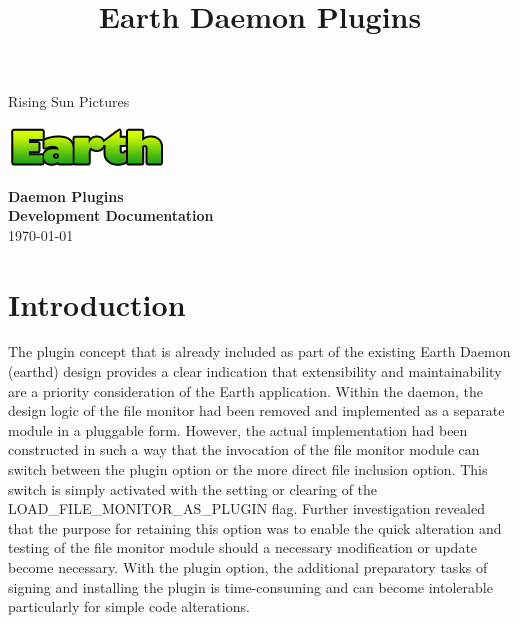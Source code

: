 \documentclass{article}
\title{Earth Daemon Plugins}
\begin{document}
\begin{titlepage}
    \begin{center}
        Rising Sun Pictures \\
        \vspace{1cm}
        \begin{center}                
        \includegraphics{earth.png} \\
        \end{center}
        \vspace{5cm}
        {\LARGE\bf Daemon Plugins} \\
        \vspace{5cm}
        {\LARGE\bf Development Documentation} \\
        \vspace{6cm}
        \today
    \end{center}
\end{titlepage}

\tableofcontents
\listoffigures

\newpage

\section{Introduction} %
\label{sec:introduction}

\noindent
The plugin concept that is already included as part of the existing Earth Daemon (earthd) design provides a clear indication that extensibility and maintainability are a priority consideration of the Earth application. Within the daemon, the design logic of the file monitor had been removed and implemented as a separate module in a pluggable form. However, the actual implementation had been constructed in such a way that the invocation of the file monitor module can switch between the plugin option or the more direct file inclusion option. This switch is simply activated with the setting or clearing of the LOAD\_FILE\_MONITOR\_AS\_PLUGIN flag. Further investigation revealed that the purpose for retaining this option was to enable the quick alteration and testing of the file monitor module should a necessary modification or update become necessary. With the plugin option, the additional preparatory tasks of signing and installing the plugin is time-consuming and can become intolerable particularly for simple code alterations. \\ 
\end{document}
